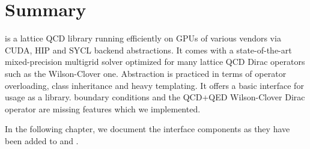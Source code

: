 \section{Summary}
\label{sec:quda:summary}


\Quda is a lattice QCD library running efficiently on GPUs of various vendors via CUDA, HIP and SYCL backend abstractions.
It comes with a state-of-the-art mixed-precision multigrid solver optimized for many lattice QCD Dirac operators such as the Wilson-Clover one.
Abstraction is practiced in terms of operator overloading, class inheritance and heavy templating.
It offers a basic interface for usage as a library.
\Cstar boundary conditions and the QCD+QED Wilson-Clover Dirac operator are missing features which we implemented.

In the following chapter, we document the interface components as they have been added to \openqxd and \quda.
